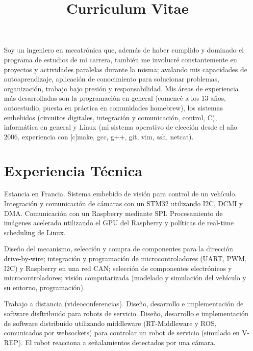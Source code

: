 \documentclass[11pt,a4paper,sans]{moderncv}	%
\title{Curriculum Vitae}
\begin{document}
\maketitle
Soy un ingeniero en mecatrónica que, además de haber cumplido y dominado el programa de estudios de mi carrera, también me involucré constantemente en proyectos y actividades paralelas durante la misma; avalando mis capacidades de autoaprendizaje, aplicación de conocimiento para solucionar problemas, organización, trabajo bajo presión y responsabilidad. Mis áreas de experiencia más desarrolladas son la programación en general (comencé a los 13 años, autoestudio, puesta en práctica en comunidades homebrew), los sistemas embebidos (circuitos digitales, integración y comunicación, control, C), informática en general y Linux (mi sistema operativo de elección desde el año 2006, experiencia con [c]make, gcc, g++, git, vim, ssh, netcat).

\section{Experiencia Técnica}
{Estancia en Francia. Sistema embebido de visión para control de un vehículo. Integración y comunicación de cámaras con un STM32 utilizando I2C, DCMI y DMA. Comunicación con un Raspberry mediante SPI. Procesamiento de imágenes acelerado utilizando el GPU del Raspberry y políticas de real-time scheduling de Linux.}

{Diseño del mecanismo, selección y compra de componentes para la dirección drive-by-wire; integración y programación de microcontroladores (UART, PWM, I2C) y Raspberry en una red CAN; selección de componentes electrónicos y microcontroladores; visión computarizada (modelado y simulación del vehículo y su entorno, programación).}

{Trabajo a distancia (videoconferencias). Diseño, desarrollo e implementación de software disftribuido para robots de servicio. Diseño, desarrollo e implementación de software distribuido utilizando middleware (RT-Middleware y ROS, comunicados por websockets) para controlar un robot de servicio (simulado en V-REP). El robot reacciona a señalamientos detectados por una cámara.}
\end{document}

